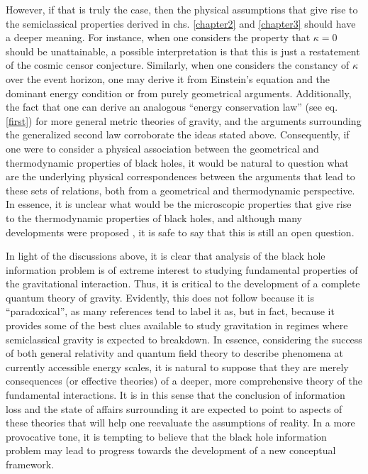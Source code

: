 \documentclass[
12pt,		%
openright,	%
twoside,  %
a4paper,			%
chapter=TITLE,		%
english,			%
french,				%
spanish,			%
brazil				%
]{USPSC-classe/USPSC}
\begin{document}
However, if that is truly the case, then the physical assumptions that give rise to the semiclassical properties derived in chs. \ref{chapter2} and \ref{chapter3} should have a deeper meaning. For instance, when one considers the property that $\kappa=0$ should be unattainable, a possible interpretation is that this is just a restatement of the cosmic censor conjecture. Similarly, when one considers the constancy of $\kappa$ over the event horizon, one may derive it from Einstein's equation and the dominant energy condition or from purely geometrical arguments. Additionally, the fact that one can derive an analogous ``energy conservation law'' (see eq. \ref{first}) for more general metric theories of gravity, and the arguments surrounding the generalized second law corroborate the ideas stated above. Consequently, if one were to consider a physical association between the geometrical and thermodynamic properties of black holes, it would be natural to question what are the underlying physical correspondences between the arguments that lead to these sets of relations, both from a geometrical and thermodynamic perspective. In essence, it is unclear what would be the microscopic properties that give rise to the thermodynamic properties of black holes, and although many developments were proposed \cite{Wald2001}, it is safe to say that this is still an open question.

In light of the discussions above, it is clear that analysis of the black hole information problem is of extreme interest to studying fundamental properties of the gravitational interaction. Thus, it is critical to the development of a complete quantum theory of gravity. Evidently, this does not follow because it is ``paradoxical'', as many references tend to label it as, but in fact, because it provides some of the best clues available to study gravitation in regimes where semiclassical gravity is expected to breakdown. In essence, considering the success of both general relativity and quantum field theory to describe phenomena at currently accessible energy scales, it is natural to suppose that they are merely consequences (or effective theories) of a deeper, more comprehensive theory of the fundamental interactions. It is in this sense that the conclusion of information loss and the state of affairs surrounding it are expected to point to aspects of these theories that will help one reevaluate the assumptions of reality. In a more provocative tone, it is tempting to believe that the black hole information problem may lead to progress towards the development of a new conceptual framework.
\end{document}
